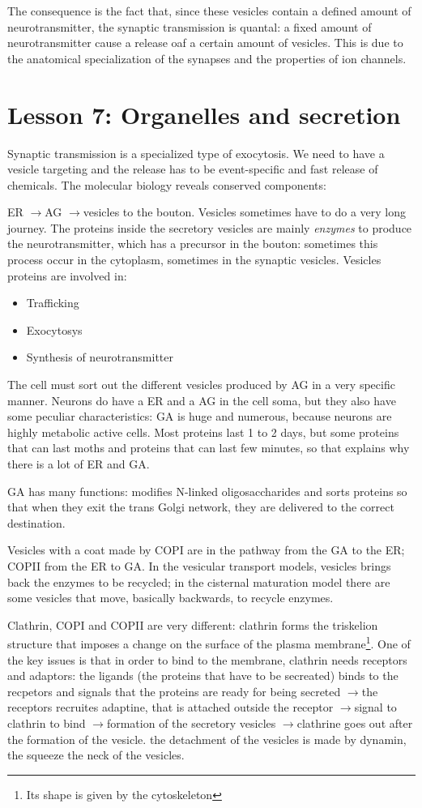 \documentclass[a4paper, 12pt]{book}
\newcommand{\lfreccia}{\ensuremath{\longrightarrow}}
\begin{document}
The consequence is the fact that, since these vesicles contain a defined amount of neurotransmitter, the synaptic transmission is quantal: a fixed amount of neurotransmitter cause a release oaf a certain amount of vesicles.  This is due to the anatomical specialization of the synapses and the properties of ion channels.

\chapter{Lesson 7: Organelles and secretion}
Synaptic transmission is a specialized type of exocytosis. We need to have a vesicle targeting and the release has to be event-specific and fast release of chemicals. The molecular biology reveals conserved components: 

ER \lfreccia AG \lfreccia vesicles to the bouton. Vesicles sometimes have to do a very long journey. The proteins inside the secretory vesicles are mainly \emph{enzymes} to produce the neurotransmitter, which has a precursor in the bouton: sometimes this process occur in the cytoplasm, sometimes in the synaptic vesicles. Vesicles proteins are involved in:
\begin{itemize}
\item{Trafficking}
\item{Exocytosys}
\item{Synthesis of neurotransmitter}
\end{itemize}

The cell must sort out the different vesicles produced by AG in a very specific manner. Neurons do have a ER and a AG in the cell soma, but they also have some peculiar characteristics: GA is huge and numerous, because neurons are highly metabolic active cells. Most proteins last 1 to 2 days, but some proteins that can last moths and proteins that can last few minutes, so that explains why there is a lot of ER and GA.

GA has many functions: modifies N-linked oligosaccharides and sorts proteins so that when they exit the trans Golgi network, they are delivered to the correct destination.


Vesicles with a coat made by   COPI are in the pathway from the GA to the ER; COPII from the ER to GA. In the vesicular transport models, vesicles brings back the enzymes to be recycled; in the cisternal maturation model there are some vesicles that move, basically backwards, to recycle enzymes. 

Clathrin, COPI and COPII are very different: clathrin forms the triskelion structure that imposes a change on the surface of the plasma membrane\footnote{Its shape is given by the cytoskeleton}. One of the key issues is that in order to bind to the membrane, clathrin needs receptors and adaptors: the ligands (the proteins that have to be secreated) binds to the recpetors and signals that the proteins are ready for being secreted \lfreccia the receptors recruites adaptine, that is attached outside the receptor \lfreccia signal to clathrin to bind \lfreccia formation of the secretory vesicles \lfreccia clathrine goes out after the formation of the vesicle. the detachment of the vesicles is made by dynamin, the squeeze the neck of the vesicles.
\end{document}
